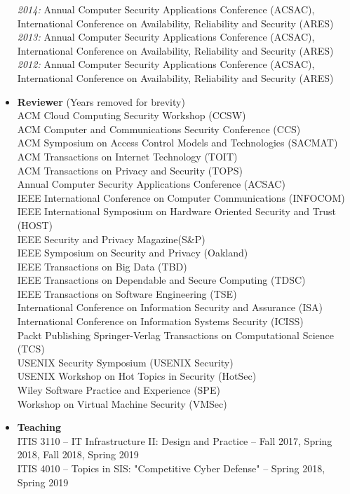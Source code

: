 \documentclass[10pt]{article}
\begin{document}
\begin{itemize}
    \textit{2014:} Annual Computer Security Applications Conference (ACSAC), International Conference on Availability, Reliability and Security (ARES)\\
    \textit{2013:} Annual Computer Security Applications Conference (ACSAC), International Conference on Availability, Reliability and Security (ARES)\\
    \textit{2012:} Annual Computer Security Applications Conference (ACSAC), International Conference on Availability, Reliability and Security (ARES)\\
  \item \textbf{Reviewer} (Years removed for brevity)\\
  ACM Cloud Computing Security Workshop (CCSW)\\
  ACM Computer and Communications Security Conference (CCS)\\
  ACM Symposium on Access Control Models and Technologies (SACMAT)\\
  ACM Transactions on Internet Technology (TOIT)\\
  ACM Transactions on Privacy and Security (TOPS)\\
  Annual Computer Security Applications Conference (ACSAC)\\
  IEEE International Conference on Computer Communications (INFOCOM)\\
  IEEE International Symposium on Hardware Oriented Security and Trust (HOST)\\
  IEEE Security and Privacy Magazine(S\&P)\\
  IEEE Symposium on Security and Privacy (Oakland)\\
  IEEE Transactions on Big Data (TBD)\\
  IEEE Transactions on Dependable and Secure Computing (TDSC)\\
  IEEE Transactions on Software Engineering (TSE)\\
  International Conference on Information Security and Assurance (ISA)\\
  International Conference on Information Systems Security (ICISS)\\
  Packt Publishing
  Springer-Verlag Transactions on Computational Science (TCS)\\
  USENIX Security Symposium (USENIX Security)\\
  USENIX Workshop on Hot Topics in Security (HotSec)\\
  Wiley Software Practice and Experience (SPE)\\
  Workshop on Virtual Machine Security (VMSec)
  \item \textbf{Teaching}\\
  ITIS 3110 -- IT Infrastructure II: Design and Practice -- Fall 2017, Spring 2018, Fall 2018, Spring 2019\\
  ITIS 4010 -- Topics in SIS: "Competitive Cyber Defense" -- Spring 2018, Spring 2019
\end{itemize}
\end{document}
